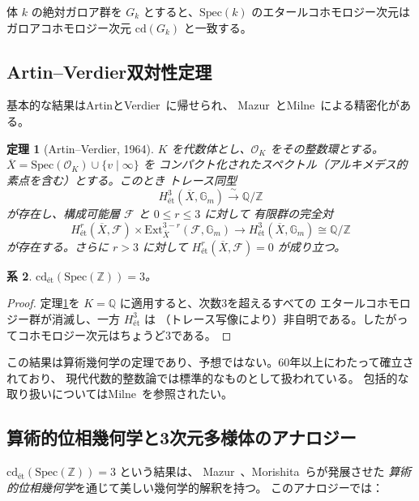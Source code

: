\documentclass[12pt,a4paper]{article}
\newtheorem{theorem}{定理}[section]
\newtheorem{corollary}[theorem]{系}
\theoremstyle{definition}
\newcommand{\Spec}{\mathrm{Spec}}
\newcommand{\cd}{\mathrm{cd}}
\newcommand{\ZZ}{\mathbb{Z}}
\newcommand{\QQ}{\mathbb{Q}}
\begin{document}
体 $k$ の絶対ガロア群を $G_k$ とすると、$\Spec(k)$ のエタールコホモロジー次元は
ガロアコホモロジー次元 $\cd(G_k)$ と一致する。

\subsection{Artin--Verdier双対性定理}

基本的な結果はArtinとVerdier~\cite{ArtinVerdier1964}に帰せられ、
Mazur~\cite{Mazur1973}とMilne~\cite{Milne1986,Milne2006}による精密化がある。

\begin{theorem}[Artin--Verdier, 1964]\label{thm:AV}
$K$ を代数体とし、$\mathscr{O}_K$ をその整数環とする。
$\overline{X} = \Spec(\mathscr{O}_K) \cup \{v \mid \infty\}$ を
コンパクト化されたスペクトル（アルキメデス的素点を含む）とする。このとき
トレース同型
\[
  H^3_{\text{\'et}}(\overline{X}, \mathbb{G}_m) \xrightarrow{\;\sim\;} \QQ/\ZZ
\]
が存在し、構成可能層 $\mathscr{F}$ と $0 \leq r \leq 3$ に対して
有限群の完全対
\[
  H^r_{\text{\'et}}(\overline{X}, \mathscr{F}) \times
  \mathrm{Ext}^{3-r}_{\overline{X}}(\mathscr{F}, \mathbb{G}_m)
  \longrightarrow H^3_{\text{\'et}}(\overline{X}, \mathbb{G}_m) \cong \QQ/\ZZ
\]
が存在する。さらに $r > 3$ に対して
$H^r_{\text{\'et}}(\overline{X}, \mathscr{F}) = 0$ が成り立つ。
\end{theorem}

\begin{corollary}\label{cor:cd3}
$\cd_{\text{\'et}}(\Spec(\ZZ)) = 3$。
\end{corollary}

\begin{proof}
定理\ref{thm:AV}を $K = \QQ$ に適用すると、次数3を超えるすべての
エタールコホモロジー群が消滅し、一方 $H^3_{\text{\'et}}$ は
（トレース写像により）非自明である。したがってコホモロジー次元はちょうど3である。
\end{proof}

この結果は算術幾何学の定理であり、予想ではない。60年以上にわたって確立されており、
現代代数的整数論では標準的なものとして扱われている。
包括的な取り扱いについてはMilne~\cite{Milne2006}を参照されたい。

\subsection{算術的位相幾何学と3次元多様体のアナロジー}

$\cd_{\text{\'et}}(\Spec(\ZZ)) = 3$ という結果は、
Mazur~\cite{Mazur1964}、Morishita~\cite{Morishita2012}らが発展させた
\emph{算術的位相幾何学}を通じて美しい幾何学的解釈を持つ。
このアナロジーでは：
\end{document}
